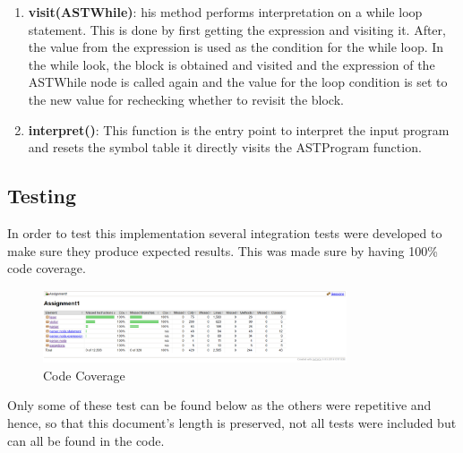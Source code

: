 \documentclass{article}
\begin{document}
\begin{enumerate}
						\item \textbf{visit(ASTWhile)}: his method performs interpretation on a while loop statement. This is done by first getting the expression and visiting it. After, the value from the expression is used as the condition for the while loop. In the while look, the block is obtained and visited and the expression of the ASTWhile node is called again and the value for the loop condition is set to the new value for rechecking whether to revisit the block.
	
	
						\item \textbf{interpret()}: This function is the entry point to interpret the input program and resets the symbol table it directly visits the ASTProgram function.
						

			\end{enumerate}
			
			\subsection{Testing}
			
			In order to test this implementation several integration tests were developed to make sure they produce expected results. This was made sure by having 100\% code coverage. 
			
				\begin{figure}[H]
					\centering
			 			\includegraphics[width=0.8\textwidth]{jacoco.png}
			 			\centering
			  			\caption{Code Coverage}
			  			\label{fig:jacoco}
					\end{figure}
					
					
					Only some of these test can be found below as the others were repetitive and hence, so that this document's length is preserved, not all tests were included but can all be found in the code.
			
\end{document}

